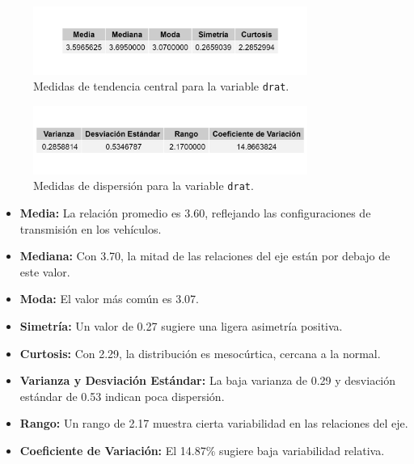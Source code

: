 \documentclass{article}
\begin{document}
\begin{enumerate}
	      \begin{figure}[H]
		      \centering
		      \includegraphics[width=0.8\textwidth]{MTC/drat_central.png}
		      \caption{Medidas de tendencia central para la variable \texttt{drat}.}
		      \label{fig:drat_central}
	      \end{figure}

	      \begin{figure}[H]
		      \centering
		      \includegraphics[width=0.8\textwidth]{MTC/drat_dispersion.png}
		      \caption{Medidas de dispersión para la variable \texttt{drat}.}
		      \label{fig:drat_dispersion}
	      \end{figure}
	     
	      \begin{itemize}
		      \item \textbf{Media:} La relación promedio es 3.60, reflejando las configuraciones de transmisión en los vehículos.
		      \item \textbf{Mediana:} Con 3.70, la mitad de las relaciones del eje están por debajo de este valor.
		      \item \textbf{Moda:} El valor más común es 3.07.
		      \item \textbf{Simetría:} Un valor de 0.27 sugiere una ligera asimetría positiva.
		      \item \textbf{Curtosis:} Con 2.29, la distribución es mesocúrtica, cercana a la normal.
		      \item \textbf{Varianza y Desviación Estándar:} La baja varianza de 0.29 y desviación estándar de 0.53 indican poca dispersión.
		      \item \textbf{Rango:} Un rango de 2.17 muestra cierta variabilidad en las relaciones del eje.
		      \item \textbf{Coeficiente de Variación:} El 14.87\% sugiere baja variabilidad relativa.
	      \end{itemize}


\end{enumerate}
\end{document}
